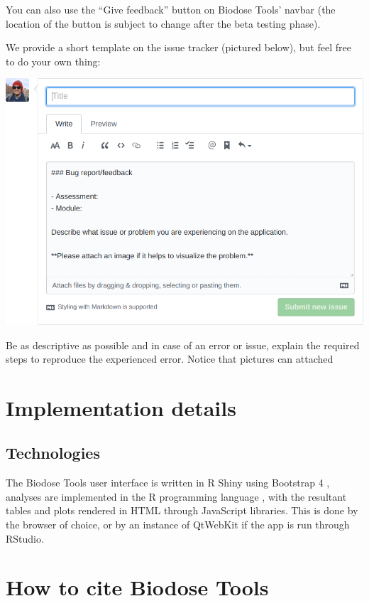 \documentclass[]{scrartcl}
\begin{document}
You can also use the ``Give feedback'' button on Biodose Tools' navbar (the location of the button is subject to change after the beta testing phase).

We provide a short template on the issue tracker (pictured below), but feel free to do your own thing:

\begin{center}\includegraphics[width=0.85\linewidth]{images/user-manual/feedback} \end{center}

Be as descriptive as possible and in case of an error or issue, explain the required steps to reproduce the experienced error. Notice that pictures can attached

\hypertarget{appendix-implementation}{%
\section{Implementation details}\label{appendix-implementation}}

\hypertarget{technologies}{%
\subsection{Technologies}\label{technologies}}

The Biodose Tools user interface is written in R Shiny \citep{R-shiny} using Bootstrap 4 \citep{R-bs4Dash}, analyses are implemented in the R programming language \citep{R-base}, with the resultant tables and plots rendered in HTML through JavaScript libraries. This is done by the browser of choice, or by an instance of QtWebKit if the app is run through RStudio.

\hypertarget{appendix-cite}{%
\section{How to cite Biodose Tools}\label{appendix-cite}}
\end{document}
